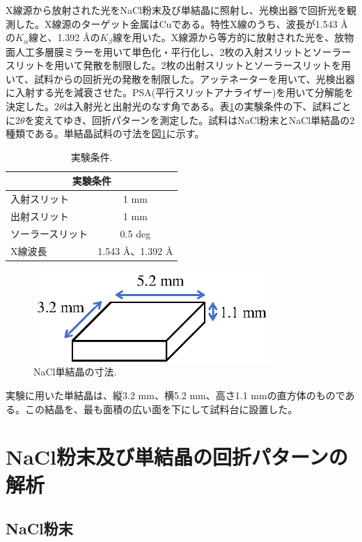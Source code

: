 \documentclass[11pt,a4j,uplatex]{jsarticle}
\begin{document}
X線源から放射された光をNaCl粉末及び単結晶に照射し、光検出器で回折光を観測した。X線源のターゲット金属はCuである。特性X線のうち、波長が1.543 \AA の$K_\alpha$線と、1.392 \AA の$K_\beta$線を用いた。X線源から等方的に放射された光を、放物面人工多層膜ミラーを用いて単色化・平行化し、2枚の入射スリットとソーラースリットを用いて発散を制限した。2枚の出射スリットとソーラースリットを用いて、試料からの回折光の発散を制限した。アッテネーターを用いて、光検出器に入射する光を減衰させた。PSA(平行スリットアナライザー)を用いて分解能を決定した。$2\theta$は入射光と出射光のなす角である。表\ref{exp}の実験条件の下、試料ごとに$2\theta$を変えてゆき、回折パターンを測定した。試料はNaCl粉末とNaCl単結晶の2種類である。単結晶試料の寸法を図\ref{size}に示す。

\begin{table}[ht]
 \centering
 \caption{実験条件.}
 \begin{tabular}{lc}\hline
  \multicolumn{2}{c}{実験条件}          \\ \hline
  入射スリット     & 1 mm               \\
  出射スリット     & 1 mm               \\
  ソーラースリット & 0.5 deg            \\
  X線波長          & 1.543 \AA、1.392 \AA \\\hline
 \end{tabular}
 \label{exp}
\end{table}

\begin{figure}[htb]
 \centering
 \includegraphics[clip,width=9cm]{bulk.eps}
 \caption{NaCl単結晶の寸法.}
 \label{size}
\end{figure}


\newpage
実験に用いた単結晶は、縦3.2 mm、横5.2 mm、高さ1.1 mmの直方体のものである。この結晶を、最も面積の広い面を下にして試料台に設置した。

\newpage
\section{NaCl粉末及び単結晶の回折パターンの解析}


\subsection{NaCl粉末}
\end{document}
